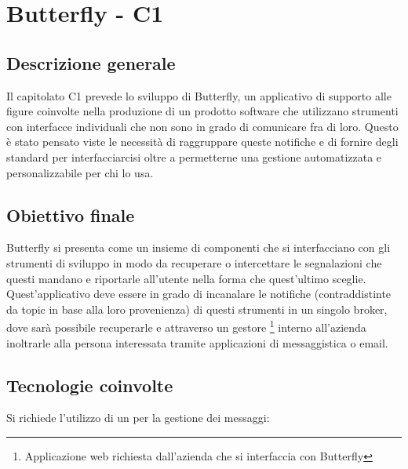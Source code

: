 \section{Butterfly - C1} \label{c1}
    \subsection{Descrizione generale}
    Il capitolato C1 prevede lo sviluppo di Butterfly, un applicativo di supporto alle figure coinvolte nella produzione di un prodotto software che utilizzano strumenti con interfacce individuali che non sono in grado di comunicare fra di loro.
    Questo  è stato pensato viste le necessità di raggruppare queste notifiche e di fornire degli standard per interfacciarcisi oltre a permetterne una gestione automatizzata e personalizzabile per chi lo usa.

    \subsection{Obiettivo finale}
    Butterfly si presenta come un insieme di componenti che si interfacciano con gli strumenti di sviluppo in modo da recuperare o intercettare le segnalazioni che questi mandano e riportarle all'utente nella forma che quest'ultimo sceglie.\\
    Quest'applicativo deve essere in grado di incanalare le notifiche (contraddistinte da topic in base alla loro
    provenienza) di questi strumenti in un singolo broker, dove sarà possibile recuperarle e attraverso un gestore%
    \footnote{Applicazione web richiesta dall'azienda che si interfaccia con Butterfly} interno all'azienda
    inoltrarle alla persona interessata tramite applicazioni di messaggistica o email.

    \subsection{Tecnologie coinvolte}
    Si richiede l'utilizzo di un  per la gestione dei messaggi:


